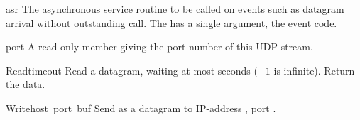 \renewcommand{\indexsubitem}{(UDP stream attribute)}

\begin{datadesc}{asr}
The asynchronous service routine to be called on events such as
datagram arrival without outstanding  call. The  has a
single argument, the event code.
\end{datadesc}

\begin{datadesc}{port}
A read-only member giving the port number of this UDP stream.
\end{datadesc}

\renewcommand{\indexsubitem}{(UDP stream method)}

\begin{funcdesc}{Read}{timeout}
Read a datagram, waiting at most  seconds ($-1$ is
infinite).  Return the data.
\end{funcdesc}

\begin{funcdesc}{Write}{host\, port\, buf}
Send  as a datagram to IP-address , port
.
\end{funcdesc}
